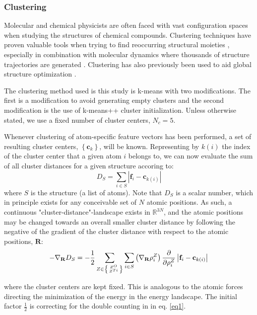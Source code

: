 \documentclass[aip,amsmath,amssymb,reprint]{revtex4-1}
\begin{document}
\subsubsection{Clustering}
Molecular and chemical physicists are often faced with vast configuration spaces when studying the structures of chemical compounds. Clustering techniques have proven valuable tools when trying to find reoccurring structural moieties \cite{Gilbert2006}, especially in combination with molecular dynamics where thousands of structure trajectories are generated \cite{Duan2010,Chema2003}. Clustering has also previously been used to aid global structure optimization \cite{Jorgensen2017}.

The clustering method used is this study is k-means with two
modifications. The first is a modification to avoid generating empty
clusters \cite{Malay2009} and the second modification is the use of
k-means++ cluster initialization. Unless otherwise stated, we use a fixed number
of cluster centers, $N_c=5$.

Whenever clustering of atom-specific feature vectors has been
performed, a set of resulting cluster centers,
$\left\{\mathbf{c}_k\right\}$, will be known. Representing by $k(i)$ the
index of the cluster center that a given atom $i$ belongs to, we can
now evaluate the sum of all cluster distances for a given structure accoring to:
\begin{equation}
D_S = \sum_{i \in S} \left|\mathbf f_i- \mathbf c_{k(i)}\right| \label{eq4}
\end{equation}
where $S$ is the structure (a list of atoms). Note that $D_S$ is a
scalar number, which in principle exists for any conceivable set of
$N$ atomic positions. As such, a continuous
"cluster-distance"-landscape exists in $\mathbb{R}^{3N}$, and the
atomic positions may be changed towards an overall smaller cluster
distance by following the negative of the gradient of the cluster distance with
respect to the atomic positions, $\mathbf{R}$:
\begin{equation}
-\nabla_\mathbf{R} D_S =-\frac{1}{2}\sum_{Z \in \left\{ Z^O \atop Z^{Ti}\right\} }\sum_{i \in S} \left(\nabla_\mathbf{R}\rho_i^Z\right)
\frac{\partial}{\partial\rho_i^Z}\left|\mathbf f_i- \mathbf c_{k(i)}\right|
\end{equation}

where the cluster centers are kept fixed. This is analogous to the
atomic forces directing the minimization of the energy in the energy
landscape. The initial factor $\frac{1}{2}$ is correcting for the double counting in in eq. \ref{eq1}.
\end{document}
